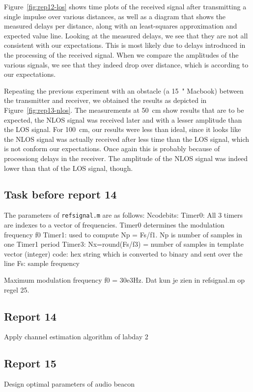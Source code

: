 \documentclass[11pt,titlepage]{report}
\begin{document}

Figure~\ref{fig:rep12-los} shows time plots of the received signal after transmitting a single impulse over various distances, as well as a diagram that shows the measured delays per distance, along with an least-squares approximation and expected value line. Looking at the measured delays, we see that they are not all consistent with our expectations. This is most likely due to delays introduced in the processing of the received signal. When we compare the amplitudes of the various signals, we see that they indeed drop over distance, which is according to our expectations.


Repeating the previous experiment with an obstacle (a \SI{15}{"} Macbook) between the transmitter and receiver, we obtained the results as depicted in Figure~\ref{fig:rep13-nlos}. The measurements at \SI{50}{cm} show results that are to be expected, the NLOS signal was received later and with a lesser amplitude than the LOS signal. For \SI{100}{cm}, our results were less than ideal, since it looks like the NLOS signal was actually received after less time than the LOS signal, which is not conform our expectations. Once again this is probably because of processiong delays in the receiver. The amplitude of the NLOS signal was indeed lower than that of the LOS signal, though.


\subsection{Task before report 14}
The parameters of \texttt{refsignal.m} are as follows:
Ncodebits: 
Timer0: All 3 timers are indexes to a vector of frequencies. Timer0 determines the modulation frequency f0
Timer1: used to compute Np = Fs/f1. Np is number of samples in one Timer1 period
Timer3: Nx=round(Fs/f3) = number of samples in template vector (integer)
code: hex string which is converted to binary and sent over the line
Fs: sample frequency

Maximum modulation frequency f0 = 30e3Hz. Dat kun je zien in refsignal.m op regel 25.



\subsection{Report 14}
Apply channel estimation algorithm of labday 2

\subsection{Report 15}
Design optimal parameters of audio beacon
\end{document}

